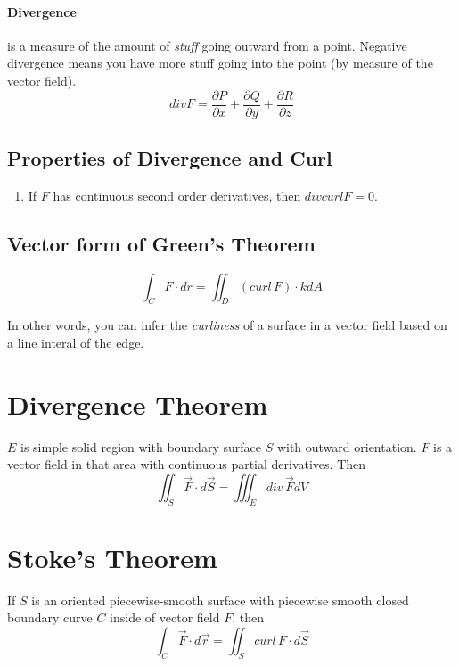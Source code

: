 \documentclass[a4paper,12pt]{report}
\begin{document}
\paragraph{Divergence } is a measure of the amount of \textit{stuff} going outward from a point. Negative divergence means you have more stuff 
going into the point (by measure of the vector field).  
$$div F = \frac{\partial P}{\partial x} + \frac{\partial Q}{\partial y} + \frac{\partial R}{\partial z}$$

\subsection{Properties of Divergence and Curl}
\begin{enumerate}
\item If $F$ has continuous second order derivatives, then $div curl F = 0$.
\end{enumerate}

\subsection{Vector form of Green's Theorem}
$$\int_C F \cdot dr = \iint_D (curl\,F)\cdot k dA$$

In other words, you can infer the \textit{curliness} of a surface in a vector field based on a line interal of the edge.

\section{Divergence Theorem}
$E$ is simple solid region with boundary surface $S$ with outward orientation. $F$ is a vector field in that area 
with continuous partial derivatives. Then
$$\iint_S \vec{F}\cdot d\vec{S} = \iiint_E div\,\vec{F} dV$$


\section{Stoke's Theorem}
If $S$ is an oriented piecewise-smooth surface with piecewise smooth closed boundary curve $C$ inside of 
vector field $F$, then 
$$\int_C \vec{F} \cdot d\vec{r} = \iint_S curl\,F\cdot d\vec{S}$$
\end{document}
